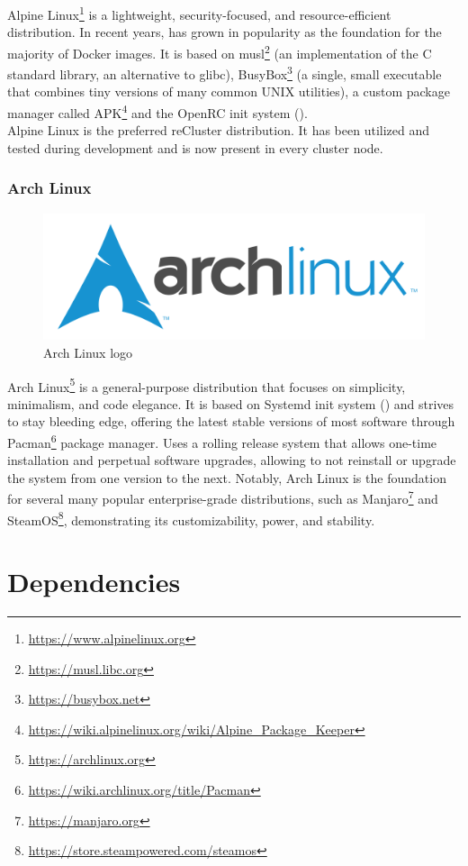 Alpine Linux\footnote{\url{https://www.alpinelinux.org}} is a lightweight, security-focused,
and resource-efficient distribution. In recent years, has grown in popularity as
the foundation for the majority of Docker images. It is based on musl\footnote{\url{https://musl.libc.org}}
(an implementation of the C standard library, an alternative to glibc), BusyBox\footnote{\url{https://busybox.net}}
(a single, small executable that combines tiny versions of many common UNIX utilities),
a custom package manager called APK\footnote{\url{https://wiki.alpinelinux.org/wiki/Alpine_Package_Keeper}}
and the OpenRC init system ()\cite{alpine_linux}. \\ %
Alpine Linux is the preferred reCluster distribution. It has been utilized and
tested during development and is now present in every cluster node.

\subsubsection{Arch Linux}
\label{subsubsec:implementation_distributions_iso_arch_linux}

\begin{figure}
  \centering
  \includegraphics[width=.25\textwidth]{images/logos/arch.png}
  \caption{Arch Linux logo}
\end{figure}

Arch Linux\footnote{\url{https://archlinux.org}} is a general-purpose
distribution that focuses on simplicity, minimalism, and code elegance. It is based
on Systemd init system () %
and strives to stay bleeding edge, offering the latest stable versions of most
software through Pacman\footnote{\url{https://wiki.archlinux.org/title/Pacman}}
package manager. Uses a rolling release system that allows one-time installation
and perpetual software upgrades, allowing to not reinstall or upgrade the system
from one version to the next. Notably, Arch Linux is the foundation for several
many popular enterprise-grade distributions, such as Manjaro\footnote{\url{https://manjaro.org}}
and SteamOS\footnote{\url{https://store.steampowered.com/steamos}},
demonstrating its customizability, power, and stability\cite{arch_linux}.

\section{Dependencies}
\label{sec:implementation_dependencies}


